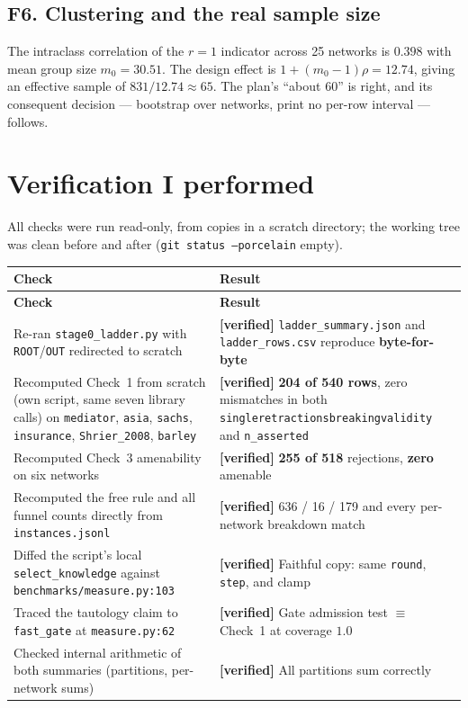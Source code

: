 \documentclass[11pt,a4paper]{article}
\newcommand{\code}[1]{\texttt{\small\hspace{0pt}#1}}
\newcommand{\ul}{\discretionary{\_}{}{\_}}
\newcommand{\verified}{\textcolor{accent}{\textbf{[verified]}}}
\begin{document}
\subsection{F6. Clustering and the real sample size}

The intraclass correlation of the $r=1$ indicator across 25 networks is $\mathbf{0.398}$ with mean
group size $m_0 = 30.51$. The design effect is $1 + (m_0-1)\rho = 12.74$, giving an effective
sample of $831/12.74 \approx 65$. The plan's ``about 60'' is right, and its consequent decision ---
bootstrap over networks, print no per-row interval --- follows.

\section{Verification I performed}

All checks were run read-only, from copies in a scratch directory; the working tree was clean
before and after (\code{git status --porcelain} empty).

\begin{longtable}{@{}p{7.2cm}p{7.6cm}@{}}
\toprule
\textbf{Check} & \textbf{Result} \\
\midrule
\endfirsthead
\toprule
\textbf{Check} & \textbf{Result} \\
\midrule
\endhead
Re-ran \code{stage0\_ladder.py} with \code{ROOT}/\code{OUT} redirected to scratch &
\verified{} \code{ladder\_summary.json} and \code{ladder\_rows.csv} reproduce
\textbf{byte-for-byte} \\
\addlinespace
Recomputed Check~1 from scratch (own script, same seven library calls) on \code{mediator},
\code{asia}, \code{sachs}, \code{insurance}, \code{Shrier\_2008}, \code{barley} &
\verified{} \textbf{204 of 540 rows}, zero mismatches in both
\code{single\ul retractions\ul breaking\ul validity} and \code{n\_asserted} \\
\addlinespace
Recomputed Check~3 amenability on six networks &
\verified{} \textbf{255 of 518} rejections, \textbf{zero} amenable \\
\addlinespace
Recomputed the free rule and all funnel counts directly from \code{instances.jsonl} &
\verified{} 636 / 16 / 179 and every per-network breakdown match \\
\addlinespace
Diffed the script's local \code{select\_knowledge} against
\code{benchmarks/measure.py:103} &
\verified{} Faithful copy: same \code{round}, \code{step}, and clamp \\
\addlinespace
Traced the tautology claim to \code{fast\_gate} at \code{measure.py:62} &
\verified{} Gate admission test $\equiv$ Check~1 at coverage $1.0$ \\
\addlinespace
Checked internal arithmetic of both summaries (partitions, per-network sums) &
\verified{} All partitions sum correctly \\
\bottomrule
\end{longtable}
\end{document}
